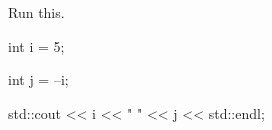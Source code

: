  Run this.

\begin{console}

int i = 5;

int j = --i;

std::cout << i << " " << j << std::endl;

\end{console}

